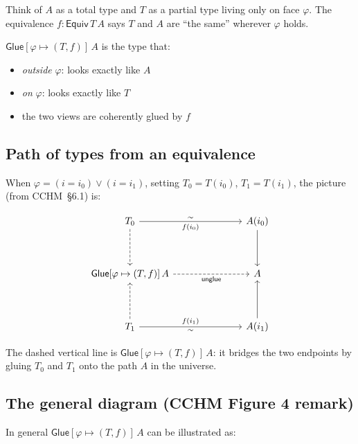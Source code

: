 \documentclass[11pt, a4paper]{article}
\newcommand{\pt}[1]{\mathsf{#1}}
\newcommand{\GlueT}{\pt{Glue}}
\newcommand{\unglueT}{\pt{unglue}}
\newcommand{\EquivT}{\pt{Equiv}}
\newcommand{\sys}[2]{[#1 \mapsto #2]}
\newcommand{\io}{i_0}
\newcommand{\ii}{i_1}
\begin{document}
Think of $A$ as a total type and $T$ as a partial type living only on face
$\varphi$. The equivalence $f : \EquivT\, T\, A$ says $T$ and $A$ are ``the
same'' wherever $\varphi$ holds.

\medskip\noindent$\GlueT\sys{\varphi}{(T,f)}\,A$ is the type that:
\begin{itemize}
  \item \emph{outside} $\varphi$: looks exactly like $A$
  \item \emph{on} $\varphi$: looks exactly like $T$
  \item the two views are coherently glued by $f$
\end{itemize}

\subsection{Path of types from an equivalence}

When $\varphi = (i = \io) \vee (i = \ii)$, setting $T_0 = T(\io)$,
$T_1 = T(\ii)$, the picture (from CCHM~\S6.1) is:

\[
\begin{tikzcd}[column sep=2.5cm, row sep=1.3cm]
  T_0
    \arrow[r, "\sim", "f(\io)"']
    \arrow[d, dashed]
  & A(\io) \arrow[d] \\
  \GlueT\sys{\varphi}{(T,f)}\,A
    \arrow[r, dashed, "\unglueT"']
  & A \\
  T_1
    \arrow[u, dashed]
    \arrow[r, "\sim"', "f(\ii)"]
  & A(\ii) \arrow[u]
\end{tikzcd}
\]

The dashed vertical line is $\GlueT\sys{\varphi}{(T,f)}\,A$: it bridges the
two endpoints by gluing $T_0$ and $T_1$ onto the path $A$ in the universe.

\subsection{The general diagram (CCHM Figure 4 remark)}

In general $\GlueT\sys{\varphi}{(T,f)}\,A$ can be illustrated as:
\end{document}
